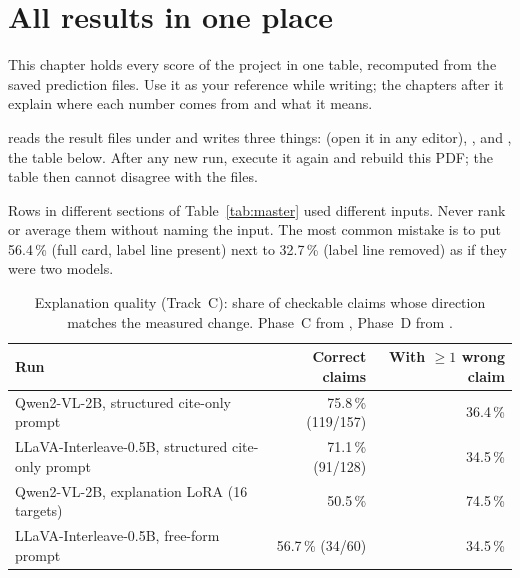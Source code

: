 \chapter{All results in one place}
\label{ch:results}

This chapter holds every score of the project in one table, recomputed from the saved prediction files. Use it as your reference while writing; the chapters after it explain where each number comes from and what it means.

\begin{wherecode}
 reads the result files under  and writes three things:  (open it in any editor), , and , the table below. After any new run, execute it again and rebuild this PDF; the table then cannot disagree with the files.
\end{wherecode}

\begin{watchout}
Rows in different sections of Table~\ref{tab:master} used different inputs. Never rank or average them without naming the input. The most common mistake is to put 56.4\,\% (full card, label line present) next to 32.7\,\% (label line removed) as if they were two models.
\end{watchout}



\begin{table}[H]
\centering
\caption{Explanation quality (Track~C): share of checkable claims whose direction matches the measured change. Phase~C from , Phase~D from .}
\label{tab:masterclaims}
\small
\begin{tabularx}{\textwidth}{Yrr}
\toprule
Run & Correct claims & With $\ge1$ wrong claim \\
\midrule
Qwen2-VL-2B, structured cite-only prompt & 75.8\,\% (119/157) & 36.4\,\% \\
LLaVA-Interleave-0.5B, structured cite-only prompt & 71.1\,\% (91/128) & 34.5\,\% \\
Qwen2-VL-2B, explanation LoRA (16 targets) & 50.5\,\% & 74.5\,\% \\
LLaVA-Interleave-0.5B, free-form prompt & 56.7\,\% (34/60) & 34.5\,\% \\
\bottomrule
\end{tabularx}
\end{table}

